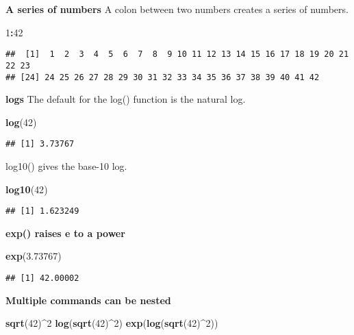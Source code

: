 \documentclass[]{book}
\newenvironment{Shaded}{\begin{snugshade}}{\end{snugshade}}
\newcommand{\KeywordTok}[1]{\textcolor[rgb]{0.13,0.29,0.53}{\textbf{#1}}}
\newcommand{\DecValTok}[1]{\textcolor[rgb]{0.00,0.00,0.81}{#1}}
\newcommand{\FloatTok}[1]{\textcolor[rgb]{0.00,0.00,0.81}{#1}}
\newcommand{\OperatorTok}[1]{\textcolor[rgb]{0.81,0.36,0.00}{\textbf{#1}}}
\newcommand{\NormalTok}[1]{#1}
\theoremstyle{definition}
\theoremstyle{definition}
\theoremstyle{definition}
\theoremstyle{remark}
\begin{document}
\textbf{A series of numbers} A colon between two numbers creates a
series of numbers.

\begin{Shaded}
\begin{Highlighting}[]
\DecValTok{1}\OperatorTok{:}\DecValTok{42}
\end{Highlighting}
\end{Shaded}

\begin{verbatim}
##  [1]  1  2  3  4  5  6  7  8  9 10 11 12 13 14 15 16 17 18 19 20 21 22 23
## [24] 24 25 26 27 28 29 30 31 32 33 34 35 36 37 38 39 40 41 42
\end{verbatim}

\textbf{logs} The default for the log() function is the natural log.

\begin{Shaded}
\begin{Highlighting}[]
\KeywordTok{log}\NormalTok{(}\DecValTok{42}\NormalTok{)}
\end{Highlighting}
\end{Shaded}

\begin{verbatim}
## [1] 3.73767
\end{verbatim}

log10() gives the base-10 log.

\begin{Shaded}
\begin{Highlighting}[]
\KeywordTok{log10}\NormalTok{(}\DecValTok{42}\NormalTok{)}
\end{Highlighting}
\end{Shaded}

\begin{verbatim}
## [1] 1.623249
\end{verbatim}

\textbf{exp() raises e to a power}

\begin{Shaded}
\begin{Highlighting}[]
\KeywordTok{exp}\NormalTok{(}\FloatTok{3.73767}\NormalTok{)}
\end{Highlighting}
\end{Shaded}

\begin{verbatim}
## [1] 42.00002
\end{verbatim}

\textbf{Multiple commands can be nested}

\begin{Shaded}
\begin{Highlighting}[]
\KeywordTok{sqrt}\NormalTok{(}\DecValTok{42}\NormalTok{)}\OperatorTok{^}\DecValTok{2}
\KeywordTok{log}\NormalTok{(}\KeywordTok{sqrt}\NormalTok{(}\DecValTok{42}\NormalTok{)}\OperatorTok{^}\DecValTok{2}\NormalTok{)}
\KeywordTok{exp}\NormalTok{(}\KeywordTok{log}\NormalTok{(}\KeywordTok{sqrt}\NormalTok{(}\DecValTok{42}\NormalTok{)}\OperatorTok{^}\DecValTok{2}\NormalTok{))}
\end{Highlighting}
\end{Shaded}
\end{document}
